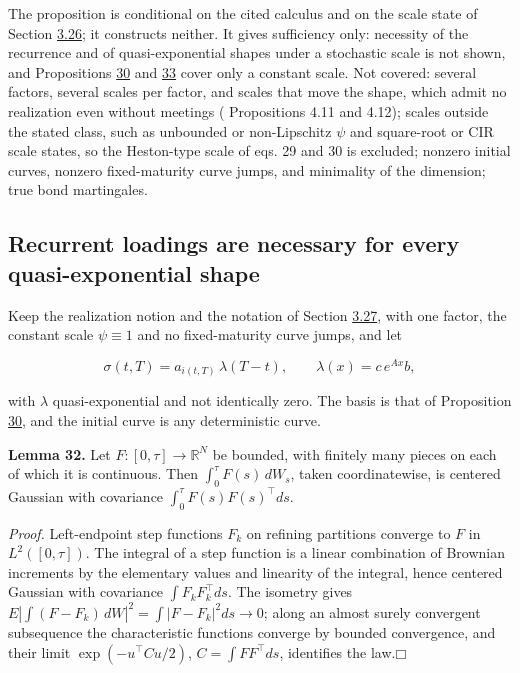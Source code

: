 \documentclass[11pt]{article}
\providecommand{\square}{\mdlgwhtsquare}
\begin{document}
The proposition is conditional on the cited calculus and on the scale state of Section \hyperref[sec:3.26]{3.26}; it constructs neither. It gives sufficiency only: necessity of the recurrence and of quasi-exponential shapes under a stochastic scale is not shown, and Propositions \hyperref[res:Proposition-30]{30} and \hyperref[res:Proposition-33]{33} cover only a constant scale. Not covered: several factors, several scales per factor, and scales that move the shape, which admit no realization even without meetings (\cite{bjork2004finite} Propositions 4.11 and 4.12); scales outside the stated class, such as unbounded or non-Lipschitz \(\psi\) and square-root or CIR scale states, so the Heston-type scale of \cite{brace2024sofr} eqs. 29 and 30 is excluded; nonzero initial curves, nonzero fixed-maturity curve jumps, and minimality of the dimension; true bond martingales.

\subsection{Recurrent loadings are necessary for every quasi-exponential shape}\label{sec:3.29}

Keep the realization notion and the notation of Section \hyperref[sec:3.27]{3.27}, with one factor, the constant scale \(\psi\equiv1\) and no fixed-maturity curve jumps, and let

\begin{equation*}
\sigma(t,T)=a_{i(t,T)}\,\lambda(T-t),\qquad \lambda(x)=c\,e^{Ax}b, \tag{3.149}\label{eq:3.149}
\end{equation*}

with \(\lambda\) quasi-exponential and not identically zero. The basis is that of Proposition \hyperref[res:Proposition-30]{30}, and the initial curve is any deterministic curve.

\label{res:Lemma-32}
\textbf{Lemma 32.} Let \(F:[0,\tau]\to\mathbb R^N\) be bounded, with finitely many pieces on each of which it is continuous. Then \(\int_0^\tau F(s)\,dW_s\), taken coordinatewise, is centered Gaussian with covariance \(\int_0^\tau F(s)F(s)^\top ds\).

\emph{Proof.} Left-endpoint step functions \(F_k\) on refining partitions converge to \(F\) in \(L^2([0,\tau])\). The integral of a step function is a linear combination of Brownian increments by the elementary values and linearity of the integral, hence centered Gaussian with covariance \(\int F_kF_k^\top ds\). The isometry gives \(E|\int(F-F_k)\,dW|^2=\int|F-F_k|^2ds\to0\); along an almost surely convergent subsequence the characteristic functions converge by bounded convergence, and their limit \(\exp(-u^\top Cu/2)\), \(C=\int FF^\top ds\), identifies the law.\hfill$\square$
\end{document}

